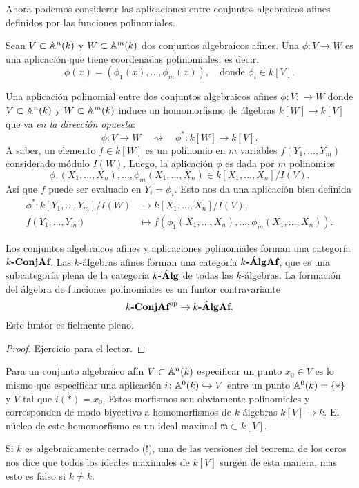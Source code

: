 \documentclass{article}
\numberwithin{equation}{section}
\theoremstyle{definition}
\begin{document}
Ahora podemos considerar las aplicaciones entre conjuntos algebraicos afines
definidos por las funciones polinomiales.

\begin{definicion}
  Sean $V\subset \AA^n (k)$ y $W\subset \AA^m (k)$ dos conjuntos algebraicos
  afines. Una  $\phi\colon V\to W$ es una aplicación
  que tiene coordenadas polinomiales; es decir,
  $$\phi (\underline{x}) = (\phi_1 (\underline{x}), \ldots, \phi_m (\underline{x})), \quad \text{donde }\phi_i\in k[V].$$
\end{definicion}

Una aplicación polinomial entre dos conjuntos algebraicos afines
$\phi\colon V\colon\to W$ donde $V \subset \AA^n (k)$ y $W \subset \AA^m (k)$
induce un homomorfismo de álgebras $k [W]\to k [V]$ que va
\emph{en la dirección opuesta}:
$$\phi\colon V\to W\quad\rightsquigarrow\quad\phi^*\colon k [W]\to k [V].$$
A saber, un elemento $f\in k[W]$ es un polinomio en $m$ variables
$f (Y_1,\ldots,Y_m)$ considerado módulo $I(W)$. Luego, la aplicación $\phi$ es
dada por $m$ polinomios
$$\phi_1 (X_1,\ldots,X_n), \ldots, \phi_m (X_1,\ldots,X_n) \in k[X_1,\ldots,X_n]/I(V).$$
Así que $f$ puede ser evaluado en $Y_i = \phi_i$. Esto nos da una aplicación
bien definida
\begin{align*}
  \phi^*\colon k[Y_1,\ldots,Y_m]/I(W) & \to k[X_1,\ldots,X_n]/I(V),\\
  f (Y_1,\ldots,Y_m) & \mapsto f (\phi_1 (X_1,\ldots,X_n), \ldots, \phi_m (X_1,\ldots,X_n)).
\end{align*}

\begin{observacion}
  Los conjuntos algebraicos afines y aplicaciones polinomiales forman una
  categoría $k\categ{-ConjAf}$. Las $k$-álgebras afines forman una categoría
  $k\categ{-ÁlgAf}$, que es una subcategoría plena de la categoría
  $k\categ{-Álg}$ de todas las $k$-álgebras. La formación del álgebra de
  funciones polinomiales es un funtor contravariante
  $$k\categ{-ConjAf}^\mathrm{op} \to k\categ{-ÁlgAf}.$$
  Este funtor es fielmente pleno.

  \begin{proof}
    Ejercicio para el lector.
  \end{proof}
\end{observacion}

\begin{ejemplo}
  Para un conjunto algebraico afín $V \subset \AA^n (k)$ especificar un punto
  $x_0\in V$ es lo mismo que especificar una aplicación
  $i\colon \AA^0 (k) \hookrightarrow V$ entre un punto $\AA^0 (k) = \{ \ast \}$
  y $V$ tal que $i (\ast) = x_0$. Estos morfismos son obviamente polinomiales y
  corresponden de modo biyectivo a homomorfismos de $k$-álgebras
  $k [V]\to k$. El núcleo de este homomorfismo es un ideal maximal
  $\mathfrak{m}\subset k[V]$.

  Si $k$ es algebraicamente cerrado (!), una de las versiones del teorema de los
  ceros nos dice que todos los ideales maximales de $k[V]$ surgen de esta
  manera, mas esto es falso si $k \ne \overline{k}$.
\end{ejemplo}
\end{document}
